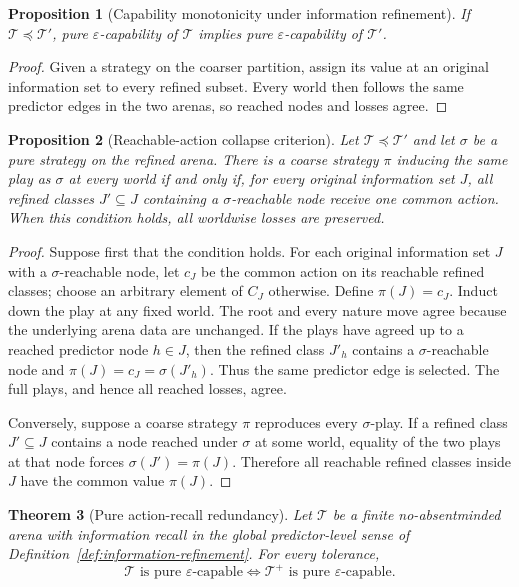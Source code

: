 \documentclass[11pt]{article}
\theoremstyle{plain}
\newtheorem{theorem}{Theorem}[section]
\newtheorem{proposition}[theorem]{Proposition}
\theoremstyle{definition}
\theoremstyle{remark}
\newcommand{\eps}{\varepsilon}
\begin{document}
\begin{proposition}[Capability monotonicity under information refinement]
\label{prop:information-refinement}
If $\mathcal T\preceq\mathcal T'$, pure $\eps$-capability of $\mathcal T$
implies pure $\eps$-capability of $\mathcal T'$.
\end{proposition}

\begin{proof}
Given a strategy on the coarser partition, assign its value at an original
information set to every refined subset. Every world then follows the same
predictor edges in the two arenas, so reached nodes and losses agree.
\end{proof}


\begin{proposition}[Reachable-action collapse criterion]
\label{prop:refinement-collapse}
Let $\mathcal T\preceq\mathcal T'$ and let $\sigma$ be a pure strategy on the
refined arena. There is a coarse strategy $\pi$ inducing the same play as
$\sigma$ at every world if and only if, for every original information set
$J$, all refined classes $J'\subseteq J$ containing a $\sigma$-reachable node
receive one common action. When this condition holds, all worldwise losses are
preserved.
\end{proposition}

\begin{proof}
Suppose first that the condition holds. For each original information set $J$
with a $\sigma$-reachable node, let $c_J$ be the common action on its reachable
refined classes; choose an arbitrary element of $C_J$ otherwise. Define
$\pi(J)=c_J$. Induct down the play at any fixed world. The root and every nature
move agree because the underlying arena data are unchanged. If the plays have
agreed up to a reached predictor node $h\in J$, then the refined class $J'_h$
contains a $\sigma$-reachable node and
$\pi(J)=c_J=\sigma(J'_h)$. Thus the same predictor edge is selected. The full
plays, and hence all reached losses, agree.

Conversely, suppose a coarse strategy $\pi$ reproduces every $\sigma$-play.
If a refined class $J'\subseteq J$ contains a node reached under $\sigma$ at
some world, equality of the two plays at that node forces
$\sigma(J')=\pi(J)$. Therefore all reachable refined classes inside $J$ have
the common value $\pi(J)$.
\end{proof}

\begin{theorem}[Pure action-recall redundancy]
\label{thm:action-recall-equivalence}
Let $\mathcal T$ be a finite no-absentminded arena with information recall in
the global predictor-level sense of Definition~\ref{def:information-refinement}.
For every tolerance,
\[
\mathcal T\text{ is pure $\eps$-capable}
\iff
\mathcal T^+\text{ is pure $\eps$-capable}.
\]
\end{theorem}
\end{document}
